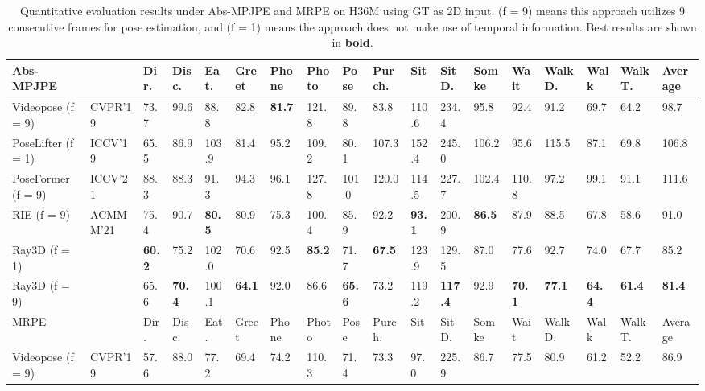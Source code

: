 \documentclass[10pt,twocolumn,letterpaper]{article}
\begin{document}
\begin{table*}[htbp]
\centering
\tiny
\caption{Quantitative evaluation results under Abs-MPJPE and MRPE on H36M using GT as 2D input. (f = 9) means this approach utilizes 9 consecutive frames for pose estimation, and (f = 1) means the approach does not make use of temporal information. Best results are shown in \textbf{bold}.}
\begin{tabular}{@{}l|llllllllllllllll|l@{}}
\toprule
Abs-MPJPE              &                                   &Dir.  &Disc. &Eat.  &Greet  &Phone & Photo & Pose & Purch.   &Sit     &SitD.  & Somke & Wait  & WalkD. & Walk & WalkT. & Average \\ \midrule
Videopose (f = 9)~\cite{dario2019videopose} &CVPR'19 &73.7  &99.6  &88.8  &82.8   &\textbf{81.7}  & 121.8 & 89.8 & 83.8     & 110.6  & 234.4 & 95.8  & 92.4  & 91.2   & 69.7 & 64.2   & 98.7    \\ 
PoseLifter (f = 1)~\cite{ju2019absposelifter}           &ICCV'19 &65.5  &86.9  &103.9 &81.4   &95.2  & 109.2 & 80.1 & 107.3    & 152.4  & 245.0 & 106.2 & 95.6  & 115.5  & 87.1 & 69.8   & 106.8   \\
PoseFormer (f = 9)~\cite{ce2021poseformer}        &ICCV'21 &88.3  &88.3  &91.3  &94.3   &96.1  & 127.8 & 101.0& 120.0    & 114.5  & 227.7 & 102.4 & 110.8 & 97.2   & 99.1 & 91.1   & 111.6   \\
RIE (f = 9)~\cite{wenkang2021improving}          &ACMMM'21&75.4  &90.7  &\textbf{80.5}  &80.9   &75.3  & 100.4 & 85.9 & 92.2     & \textbf{93.1}   & 200.9 & \textbf{86.5}  & 87.9  & 88.5   & 67.8 & 58.6   & 91.0    \\ \hline
Ray3D (f = 1)                                     &        &\textbf{60.2}  &75.2  &102.0 &70.6   &92.5  & \textbf{85.2}  & 71.7 & \textbf{67.5}     & 123.9  & 129.5 & 87.0  & 77.6  & 92.7   & 74.0 & 67.7   & 85.2    \\ 
Ray3D (f = 9)                                     &        &65.6  &\textbf{70.4}  &100.1 &\textbf{64.1}   &92.0  & 86.6  & \textbf{65.6} & 73.2     & 119.2  & \textbf{117.4} & 92.9  & \textbf{70.1}  & \textbf{77.1}   & \textbf{64.4} & \textbf{61.4}   & \textbf{81.4}    \\ \bottomrule
MRPE                    &                                  &Dir.  &Disc. &Eat.  &Greet  &Phone &Photo  & Pose & Purch.   &Sit     &SitD.  & Somke & Wait  & WalkD. & Walk & WalkT. & Average \\ \midrule
Videopose (f = 9)~\cite{dario2019videopose} &CVPR'19  &57.6  &88.0  &77.2  &69.4   &74.2  &110.3  & 71.4 & 73.3     & 97.0   & 225.9 & 86.7  & 77.5  & 80.9   & 61.2 & 52.2   & 86.9    \\ 

\end{tabular}
\end{table*}
\end{document}
